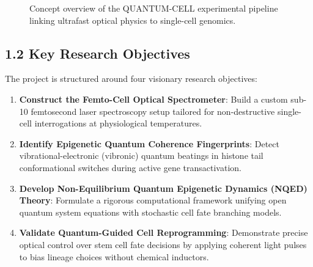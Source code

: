 \documentclass[11pt,a4paper]{article}
\begin{document}
\begin{figure}[h!]
  \centering
  \caption{\small Concept overview of the QUANTUM-CELL experimental pipeline linking ultrafast optical physics to single-cell genomics.}
  \label{fig:concept}
\end{figure}

\subsection*{1.2 Key Research Objectives}
The project is structured around four visionary research objectives:
\begin{enumerate}[label={\textbf{OBJ \arabic*:}}, leftmargin=2.5em]
  \item \textbf{Construct the Femto-Cell Optical Spectrometer}: Build a custom sub-10 femtosecond laser spectroscopy setup tailored for non-destructive single-cell interrogations at physiological temperatures.
  \item \textbf{Identify Epigenetic Quantum Coherence Fingerprints}: Detect vibrational-electronic (vibronic) quantum beatings in histone tail conformational switches during active gene transactivation.
  \item \textbf{Develop Non-Equilibrium Quantum Epigenetic Dynamics (NQED) Theory}: Formulate a rigorous computational framework unifying open quantum system equations with stochastic cell fate branching models.
  \item \textbf{Validate Quantum-Guided Cell Reprogramming}: Demonstrate precise optical control over stem cell fate decisions by applying coherent light pulses to bias lineage choices without chemical inductors.
\end{enumerate}
\end{document}
